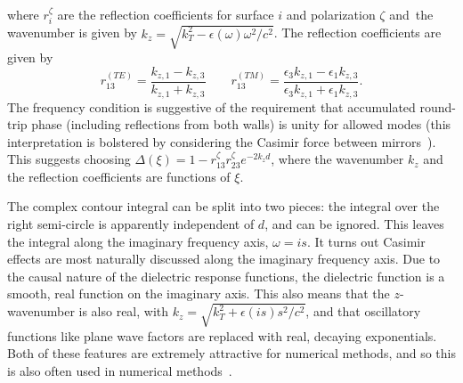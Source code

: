 where $r^\zeta_i$ are the reflection coefficients for surface $i$ and polarization $\zeta$ and\
the wavenumber is given by $k_z=\sqrt{k_T^2-\epsilon(\omega)\omega^2/c^2}$.  The reflection coefficients
are given by 
\begin{equation}
  r^{(TE)}_{13} = \frac{k_{z,1}-k_{z,3}}{k_{z,1}+k_{z,3}} \qquad 
  r^{(TM)}_{13} = \frac{\epsilon_3k_{z,1}-\epsilon_1k_{z,3}}{\epsilon_3k_{z,1}+\epsilon_1k_{z,3}}.
\end{equation}
The frequency condition is suggestive of the requirement that accumulated round-trip phase 
(including reflections from both walls) is unity for
allowed modes (this interpretation is bolstered by considering the Casimir force between mirrors~\cite{Genet2003}).
This suggests choosing $\Delta(\xi) = 1-r^{\zeta}_{13}r^{\zeta}_{23} e^{-2k_z d}$, where the wavenumber $k_z$
and the reflection coefficients are functions of $\xi$.  

The complex contour integral can be split into two pieces: the integral over the right semi-circle 
is apparently independent of $d$, and can be ignored.  This leaves the integral along the imaginary 
frequency axis, $\omega=is$.  
It turns out Casimir effects are most naturally discussed along the imaginary frequency axis.  
Due to the causal nature of the dielectric response functions, the dielectric function is a 
smooth, real function on the imaginary axis.  This also means that the $z$-wavenumber is also real,
with $k_z=\sqrt{k_T^2+\epsilon(is)s^2/c^2}$, 
and that oscillatory functions like plane wave factors are replaced with real, decaying exponentials.  
Both of these features are extremely attractive for numerical methods, and so this is also
often used in numerical methods~\cite{Johnson2011}.

